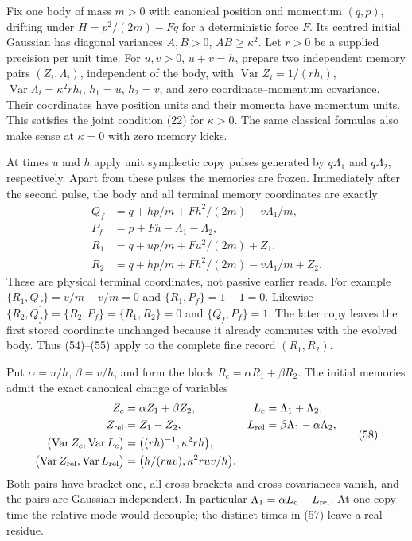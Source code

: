 \documentclass[11pt,a4paper]{article}
\begin{document}
Fix one body of mass \(m>0\) with canonical position and momentum
\((q,p)\), drifting under \(H=p^2/(2m)-Fq\) for a deterministic force
\(F\). Its centred initial Gaussian has diagonal variances \(A,B>0\),
\(AB\ge\kappa^2\). Let \(r>0\) be a supplied precision per unit time.
For \(u,v>0\), \(u+v=h\), prepare two independent memory pairs
\((Z_i,\Lambda_i)\), independent of the body, with
\(\operatorname{Var}Z_i=1/(rh_i)\),
\(\operatorname{Var}\Lambda_i=\kappa^2rh_i\), \(h_1=u\), \(h_2=v\), and
zero coordinate--momentum covariance. Their coordinates have position
units and their momenta have momentum units. This satisfies the joint
condition (22) for \(\kappa>0\). The same classical formulas also make
sense at \(\kappa=0\) with zero memory kicks.

At times \(u\) and \(h\) apply unit symplectic copy pulses generated by
\(q\Lambda_1\) and \(q\Lambda_2\), respectively. Apart from these pulses
the memories are frozen. Immediately after the second pulse, the body
and all terminal memory coordinates are exactly \[\begin{aligned}
Q_f&=q+hp/m+Fh^2/(2m)-v\Lambda_1/m,\\
P_f&=p+Fh-\Lambda_1-\Lambda_2,\\
R_1&=q+up/m+Fu^2/(2m)+Z_1,\\
R_2&=q+hp/m+Fh^2/(2m)-v\Lambda_1/m+Z_2.
\end{aligned}\tag{57}\] These are physical terminal coordinates, not
passive earlier reads. For example \(\{R_1,Q_f\}=v/m-v/m=0\) and
\(\{R_1,P_f\}=1-1=0\). Likewise
\(\{R_2,Q_f\}=\{R_2,P_f\}=\{R_1,R_2\}=0\) and \(\{Q_f,P_f\}=1\). The
later copy leaves the first stored coordinate unchanged because it
already commutes with the evolved body. Thus (54)--(55) apply to the
complete fine record \((R_1,R_2)\).

Put \(\alpha=u/h\), \(\beta=v/h\), and form the block
\(R_c=\alpha R_1+\beta R_2\). The initial memories admit the exact
canonical change of variables \[\begin{aligned}
Z_c&=\alpha Z_1+\beta Z_2,& L_c&=\Lambda_1+\Lambda_2,\\
Z_{\rm rel}&=Z_1-Z_2,&
L_{\rm rel}&=\beta\Lambda_1-\alpha\Lambda_2,\\
\bigl(\operatorname{Var}Z_c,\operatorname{Var}L_c\bigr)
 &=\bigl((rh)^{-1},\kappa^2rh\bigr),\\
\bigl(\operatorname{Var}Z_{\rm rel},
      \operatorname{Var}L_{\rm rel}\bigr)
 &=\bigl(h/(ruv),\kappa^2ruv/h\bigr).
\end{aligned}\tag{58}\] Both pairs have bracket one, all cross brackets
and cross covariances vanish, and the pairs are Gaussian independent. In
particular \(\Lambda_1=\alpha L_c+L_{\rm rel}\). At one copy time the
relative mode would decouple; the distinct times in (57) leave a real
residue.
\end{document}
